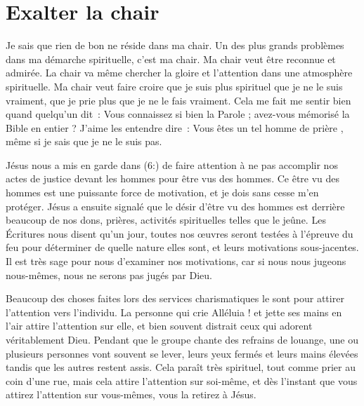 \section*{Exalter la chair}

Je sais que rien de bon ne réside dans ma chair.
 Un des plus grands problèmes dans ma démarche spirituelle, c'est ma chair.
 Ma chair veut être reconnue et admirée. La chair va même chercher
 la gloire et l'attention dans une atmosphère spirituelle.
 Ma chair veut faire croire que je suis plus spirituel que je ne le suis
 vraiment, que je prie plus que je ne le fais vraiment.
 Cela me fait me sentir bien quand quelqu'un dit~:
 \og Vous connaissez si bien la Parole ; avez-vous mémorisé la Bible
 en entier ? \fg{} J'aime les entendre dire~:
 \og Vous êtes un tel homme de prière \fg{}, même si je sais
 que je ne le suis pas.

Jésus nous a mis en garde dans (6:) de faire attention
 à ne pas accomplir nos actes de justice devant les hommes
 pour être vus des hommes. Ce \og être vu des hommes \fg{} est une
 puissante force de motivation, et je dois sans cesse m'en protéger.
 Jésus a ensuite signalé que le désir d'être vu des hommes
 est derrière beaucoup de nos dons, prières, activités spirituelles
 telles que le jeûne. Les Écritures nous disent qu'un jour,
 toutes nos œuvres seront testées à l'épreuve du feu pour déterminer
 de quelle nature elles sont, et leurs motivations sous-jacentes.
 Il est très sage pour nous d'examiner nos motivations,
 car si nous nous jugeons nous-mêmes, nous ne serons pas jugés par Dieu.

Beaucoup des choses faites lors des services charismatiques
 le sont pour attirer l'attention vers l'individu.
 La personne qui crie \og Alléluia ! \fg{} et jette ses mains en l'air
 attire l'attention sur elle, et bien souvent distrait ceux qui adorent
 véritablement Dieu. Pendant que le groupe chante des refrains de louange,
 une ou plusieurs personnes vont souvent se lever, leurs yeux fermés
 et leurs mains élevées tandis que les autres restent assis.
 Cela paraît très spirituel, tout comme prier au coin d'une rue,
 mais cela attire l'attention sur soi-même, et dès l'instant
 que vous attirez l'attention sur vous-mêmes, vous la retirez à Jésus.

\pagebreak

